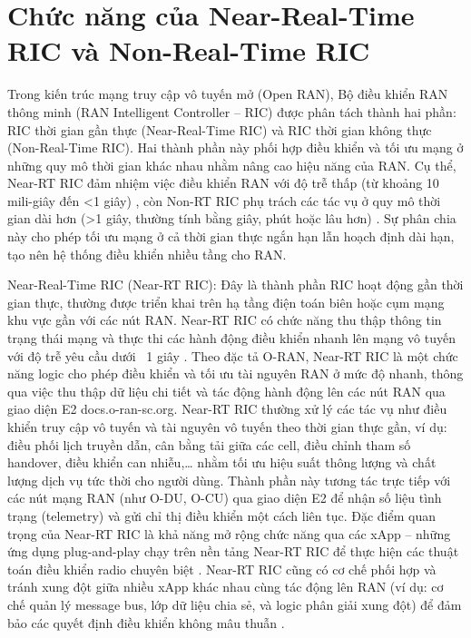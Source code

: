 \section{Chức năng của Near-Real-Time RIC và Non-Real-Time RIC}
Trong kiến trúc mạng truy cập vô tuyến mở (Open RAN), Bộ điều khiển RAN thông minh (RAN Intelligent Controller – RIC) được phân tách thành hai phần: RIC thời gian gần thực (Near-Real-Time RIC) và RIC thời gian không thực (Non-Real-Time RIC). Hai thành phần này phối hợp điều khiển và tối ưu mạng ở những quy mô thời gian khác nhau nhằm nâng cao hiệu năng của RAN. Cụ thể, Near-RT RIC đảm nhiệm việc điều khiển RAN với độ trễ thấp (từ khoảng 10 mili-giây đến <1 giây) \cite{Understanding_O-Ran}, còn Non-RT RIC phụ trách các tác vụ ở quy mô thời gian dài hơn (>1 giây, thường tính bằng giây, phút hoặc lâu hơn) \cite{Understanding_O-Ran}. Sự phân chia này cho phép tối ưu mạng ở cả thời gian thực ngắn hạn lẫn hoạch định dài hạn, tạo nên hệ thống điều khiển nhiều tầng cho RAN.

Near-Real-Time RIC (Near-RT RIC): Đây là thành phần RIC hoạt động gần thời gian thực, thường được triển khai trên hạ tầng điện toán biên hoặc cụm mạng khu vực gần với các nút RAN. Near-RT RIC có chức năng thu thập thông tin trạng thái mạng và thực thi các hành động điều khiển nhanh lên mạng vô tuyến với độ trễ yêu cầu dưới ~1 giây \cite{Understanding_O-Ran}. Theo đặc tả O-RAN, Near-RT RIC là một chức năng logic cho phép điều khiển và tối ưu tài nguyên RAN ở mức độ nhanh, thông qua việc thu thập dữ liệu chi tiết và tác động hành động lên các nút RAN qua giao diện E2 docs.o-ran-sc.org. Near-RT RIC thường xử lý các tác vụ như điều khiển truy cập vô tuyến và tài nguyên vô tuyến theo thời gian thực gần, ví dụ: điều phối lịch truyền dẫn, cân bằng tải giữa các cell, điều chỉnh tham số handover, điều khiển can nhiễu,… nhằm tối ưu hiệu suất thông lượng và chất lượng dịch vụ tức thời cho người dùng. Thành phần này tương tác trực tiếp với các nút mạng RAN (như O-DU, O-CU) qua giao diện E2 để nhận số liệu tình trạng (telemetry) và gửi chỉ thị điều khiển một cách liên tục. Đặc điểm quan trọng của Near-RT RIC là khả năng mở rộng chức năng qua các xApp – những ứng dụng plug-and-play chạy trên nền tảng Near-RT RIC để thực hiện các thuật toán điều khiển radio chuyên biệt \cite{Understanding_O-Ran}. Near-RT RIC cũng có cơ chế phối hợp và tránh xung đột giữa nhiều xApp khác nhau cùng tác động lên RAN (ví dụ: cơ chế quản lý message bus, lớp dữ liệu chia sẻ, và logic phân giải xung đột) để đảm bảo các quyết định điều khiển không mâu thuẫn \cite{Understanding_O-Ran}.

